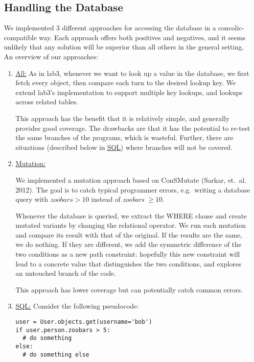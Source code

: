 \documentclass{scrartcl}
\begin{document}
\subsection{Handling the Database}
We implemented 3 different approaches for accessing the database in a
concolic-compatible way. Each approach offers both positives and negatives, and it
seems unlikely that any solution will be superior than all others in the general
setting. An overview of our approaches:

\begin{enumerate}
\item \underline{All:} As in lab3, whenever we want to look up a value
  in the database, we first fetch every object, then compare each turn to the
  desired lookup key. We extend lab3's implementation to support multiple key
  lookups, and lookups across related tables.

  This approach has the benefit that it is relatively simple, and generally
  provides good coverage. The drawbacks are that it has the potential to re-test
  the same branches of the programs, which is wasteful. Further, there are
  situations (described below in \underline{SQL}) where branches will not be
  covered.

\item \underline{Mutation:}

We implemented a mutation approach based on ConSMutate (Sarkar, et.\ al. 2012).
The goal is to catch typical programmer errors, e.g.\ writing a database
query with $\textit{zoobars} > 10$ instead of \textit{zoobars }$ \geq 10$.

Whenever the database is queried, we extract the WHERE clause and create mutated
variants by changing the relational operator. We run each mutation and compare
its result with that of the original. If the results are the same, we do
nothing. If they are different, we add the symmetric difference of the two
conditions as a new path constraint: hopefully this new constraint will
lead to a concrete value that distinguishes the two conditions, and explores an
untouched branch of the code.

This approach has lower coverage but can potentially catch common errors.

\item \underline{SQL:} Consider the following pseudocode:

\begin{verbatim}
user = User.objects.get(username='bob')
if user.person.zoobars > 5:
  # do something
else:
  # do something else
\end{verbatim}


\end{enumerate}
\end{document}
